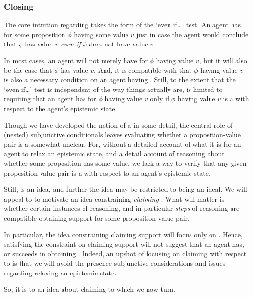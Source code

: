 \subsubsection{Closing \ideaS{}}
\label{sec:ideaS:closing}

\begin{note}
  The core intuition regarding \support{} takes the form of the `even if\dots' test.
  An agent has \support{} for some proposition \(\phi\) having some value \(v\) just in case the agent would conclude that \(\phi\) has value \(v\) \emph{even if} \(\phi\) does not have value \(v\).

  In most cases, an agent will not merely have \support{} for \(\phi\) having value \(v\), but it will also be the case that \(\phi\) has value \(v\).
  And, it is compatible with \ideaS{} that \(\phi\) having value \(v\) is also a necessary condition on an agent having \support{}.
  Still, to the extent that the `even if\dots' test is independent of the way things actually are, \ideaS{} is limited to requiring that an agent has \support{} for \(\phi\) having value \(v\) only if \(\phi\) having value \(v\) is a \sink{} with respect to the agent's epistemic state.

  Though we have developed the notion of a \sink{} in some detail, the central role of (nested) subjunctive conditionals leaves evaluating whether a proposition-value pair is a \sink{} somewhat unclear.
  For, without a detailed account of what it is for an agent to relax an epistemic state, and a detail account of reasoning about whether some proposition has some value, we lack a way to verify that any given proposition-value pair is a \sink{} with respect to an agent's epistemic state.

  Still, \ideaS{} is an idea, and further the idea may be restricted to being an ideal.
  We will appeal to \ideaS{} to motivate an idea constraining \emph{claiming} \support{}.
  What will matter is whether certain instances of reasoning, and in particular \emph{steps} of reasoning are compatible obtaining support for some proposition-value pair.

  In particular, the idea constraining claiming support will focus only on .
  Hence, satisfying the constraint on claiming support will not suggest that an agent has, or succeeds in obtaining \support{}.
  Indeed, an upshot of focusing on claiming with respect to  is that we will avoid the presence subjunctive considerations and issues regarding relaxing an epistemic state.

  So, it is to an idea about claiming \support{} to which we now turn.
\end{note}

